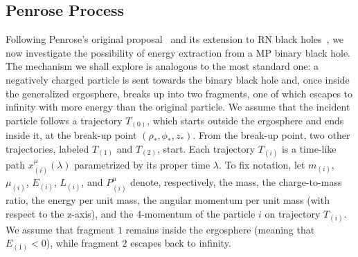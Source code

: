 
\subsection{Penrose Process}

Following Penrose's original proposal~\cite{PENROSE1971} and its extension to RN black holes~\cite{RUFFINI1971,DENARDO1973}, we now investigate the possibility of energy extraction from a MP binary black hole. The mechanism we shall explore is analogous to the most standard one: a negatively charged particle is sent towards the binary black hole and, once inside the generalized ergosphere, breaks up into two fragments, one of which escapes to infinity with more energy than the original particle. We assume that the incident particle follows a trajectory $T_{(0)}$, which starts outside the ergosphere and ends inside it, at the break-up point $(\rho_*,\phi_*,z_*)$. From the break-up point, two other trajectories, labeled $T_{(1)}$ and $T_{(2)}$, start. Each trajectory $T_{(i)}$ is a time-like path $x^{\mu}_{(i)}(\lambda)$ parametrized by its proper time $\lambda$. To fix notation, let $m_{(i)}$, $\mu_{(i)}$, $E_{(i)}$, $L_{(i)}$, and $P^{\mu}_{(i)}$ denote, respectively, the mass, the charge-to-mass ratio, the energy per unit mass, the angular momentum per unit mass (with respect to the z-axis), and the 4-momentum of the particle $i$ on trajectory $T_{(i)}$. We assume that fragment $1$ remains inside the ergosphere (meaning that $E_{(1)} < 0 $), while fragment $2$ escapes back to infinity.

